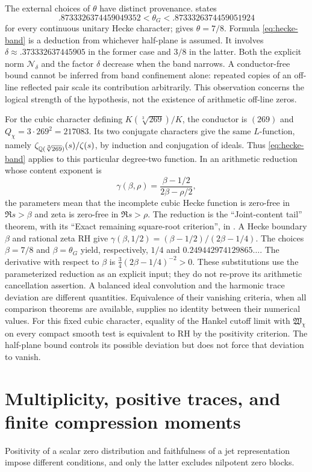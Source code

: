 The external choices of $\theta$ have distinct provenance.
\citet[Theorem~7.33, p.~66]{liu2026} states
\[
 .8733326374459049352<\theta_G<.8733326374459051924
\]
for every continuous unitary Hecke character; \citet[Theorems~1.1--1.2,
pp.~1--2]{hu2026} gives $\theta=7/8$. Formula \eqref{eq:hecke-band}
is a deduction from whichever half-plane is assumed. It involves
$\delta\approx.373332637445905$ in the former case and $3/8$ in
the latter. Both the explicit norm $\mathcal N_\delta$ and the factor
$\delta$ decrease when the band narrows. A conductor-free bound
cannot be inferred from band confinement alone: repeated copies of
an off-line reflected pair scale its contribution arbitrarily.
This observation concerns the logical strength of the hypothesis,
not the existence of arithmetic off-line zeros.

For the cubic character defining
$K(\sqrt[3]{269})/K$, the conductor is $(269)$ and
$Q_\chi=3\cdot269^2=217083$. Its two conjugate characters give the
same $L$-function, namely
$\zeta_{\mathbb Q(\sqrt[3]{269})}(s)/\zeta(s)$, by induction and
conjugation of ideals. Thus \eqref{eq:hecke-band} applies to this
particular degree-two function. In an arithmetic reduction whose
content exponent is
\[
 \gamma(\beta,\rho)
       =\frac{\beta-1/2}{2\beta-\rho/2},
\]
the parameters mean that the incomplete cubic Hecke function is
zero-free in $\Re s>\beta$ and zeta is zero-free in $\Re s>\rho$.
The reduction is the ``Joint-content tail'' theorem, with its
``Exact remaining square-root criterion'', in \citet{cubiccontentnotes}.
A Hecke boundary $\beta$ and rational zeta RH give
$\gamma(\beta,1/2)=(\beta-1/2)/(2\beta-1/4)$.
The choices $\beta=7/8$ and $\beta=\theta_G$ yield, respectively,
$1/4$ and $0.249442974129865\ldots$. The derivative with respect
to $\beta$ is $\tfrac34(2\beta-1/4)^{-2}>0$.
These substitutions use the parameterized reduction as an explicit
input; they do not re-prove its arithmetic cancellation assertion.
A balanced ideal convolution and the harmonic trace deviation are
different quantities. Equivalence of their vanishing criteria, when
all comparison theorems are available, supplies no identity between
their numerical values.
For this fixed cubic character, equality of the Hankel cutoff limit
with $\mathfrak W_\chi$ on every compact smooth test is equivalent to
RH by the positivity criterion. The half-plane bound controls its
possible deviation but does not force that deviation to vanish.



\section{Multiplicity, positive traces, and finite compression moments}
\label{sec:extensions-multiplicity}
Positivity of a scalar zero distribution and faithfulness of a jet
representation impose different conditions, and only the latter
excludes nilpotent zero blocks.

